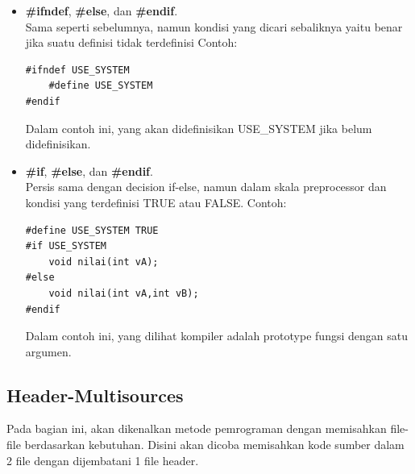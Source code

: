 \documentclass[12pt,]{article}
\begin{document}
\begin{itemize}
		\item \textbf{\#ifndef}, \textbf{\#else}, dan \textbf{\#endif}. \\
		Sama seperti sebelumnya, namun kondisi yang dicari sebaliknya yaitu benar jika suatu definisi tidak terdefinisi
		Contoh:
		\begin{verbatim}
#ifndef USE_SYSTEM
	#define USE_SYSTEM
#endif
		\end{verbatim}
		Dalam contoh ini, yang akan didefinisikan USE\_SYSTEM jika belum didefinisikan.
		
		\item \textbf{\#if}, \textbf{\#else}, dan \textbf{\#endif}. \\
		Persis sama dengan decision if-else, namun dalam skala preprocessor dan kondisi yang terdefinisi TRUE atau FALSE.
		Contoh:
		\begin{verbatim}
#define USE_SYSTEM TRUE
#if USE_SYSTEM
	void nilai(int vA);
#else
	void nilai(int vA,int vB);
#endif
		\end{verbatim}
		Dalam contoh ini, yang dilihat kompiler adalah prototype fungsi dengan satu argumen.
		
	\end{itemize}
	
	
	\newpage
	\subsection{Header-Multisources}
	
	Pada bagian ini, akan dikenalkan metode pemrograman dengan memisahkan file-file berdasarkan kebutuhan.
	Disini akan dicoba memisahkan kode sumber dalam 2 file dengan dijembatani 1 file header.
	
\end{document}
